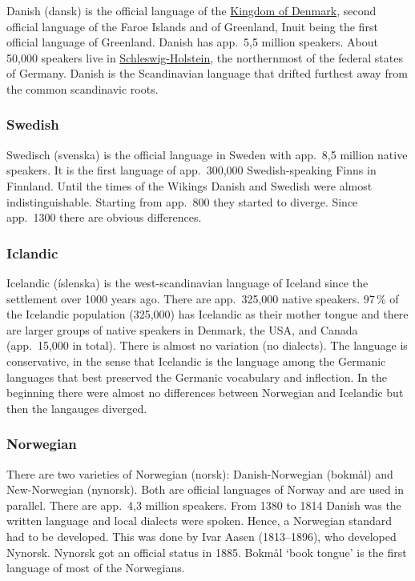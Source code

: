 Danish (dansk) is the official language of the \href{https://en.wikipedia.org/wiki/Denmark}{Kingdom of Denmark}, second official language of the
Faroe Islands and of Greenland, Inuit being the first official language of
Greenland. Danish has app.\ 5,5 million speakers. About 50,000 speakers live in \href{https://en.wikipedia.org/wiki/Schleswig-Holstein}{Schleswig-Holstein}, the northernmost of the federal states of Germany.
Danish is the Scandinavian language that drifted furthest away from the common scandinavic roots.


\subsubsection{Swedish}

Swedisch (svenska) is the official language in Sweden with app.\ 8,5 million native speakers. It is
the first language of app.\ 300,000 Swedish-speaking Finns in Finnland. Until the times of the
Wikings Danish and Swedish were almost indistinguishable. Starting from app.\ 800 they started to
diverge. Since app.\ 1300 there are obvious differences.



\subsubsection{Iclandic}


Icelandic (íslenska) is the west-scandinavian language of Iceland since the settlement over 1000
years ago. 
There are app.\ 325,000 native speakers. 97\,\% of the Icelandic population (325,000) has Icelandic as their
mother tongue and there are larger groups of native speakers in Denmark, the USA, and Canada
(app.\ 15,000 in total). 
There is almost no variation (no dialects). The language is conservative, in the sense that Icelandic
is the language among the Germanic languages that best preserved the Germanic vocabulary and inflection.
In the beginning there were almost no differences between Norwegian and Icelandic but then the
langauges diverged.

\subsubsection{Norwegian}

There are two varieties of Norwegian (norsk): Danish-Norwegian (bokmål) and New-Norwegian (nynorsk). 
Both are official languages of Norway and are used in parallel. There are app.\ 4,3 million
speakers.
From 1380 to 1814 Danish was the written language and local dialects were spoken. Hence, a Norwegian
standard had to be developed. This was done by Ivar Aasen (1813--1896), who developed
Nynorsk. Nynorsk got an official status in 1885. Bokmål `book tongue' is the first language of most
of the Norwegians.

